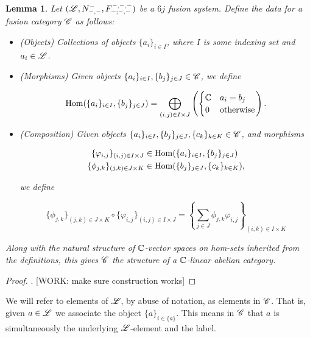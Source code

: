 \documentclass{article}
\newtheorem{lemma}{Lemma}[section]
\theoremstyle{definition}
\numberwithin{figure}{section}
\begin{document}
\begin{lemma} Let $(\mathscr{L},N_{\--,\--}^{\--},F^{\--,\--,\--}_{\--;\--,\--})$ be a $6j$ fusion system. Define the data for a fusion category $\mathscr{C}$ as follows:

\begin{itemize}
\item (Objects) Collections of objects $\{a_i\}_{i\in I}$, where $I$ is some indexing set and $a_i\in \mathscr{L}$.
\item (Morphisms) Given objects $\{a_{i}\}_{i\in I},\{b_j\}_{j\in J}\in \mathscr{C}$, we define

$$\mathrm{Hom}(\{a_{i}\}_{i\in I},\{b_j\}_{j\in J})=\bigoplus_{(i,j)\in I\times J}\left(\begin{cases} \mathbb{C} & a_i=b_j \\ 0 & \text{otherwise}\end{cases}\right).$$

\item (Composition) Given objects $\{a_{i}\}_{i\in I},\{b_j\}_{j\in J},\{c_k\}_{k\in K}\in \mathscr{C}$, and morphisms 

\begin{align*}
\{\varphi_{i,j}\}_{(i,j)\in I\times J}&\in \mathrm{Hom}(\{a_{i}\}_{i\in I},\{b_j\}_{j\in J})\\
\{\phi_{j,k}\}_{(j,k)\in J\times K}&\in \mathrm{Hom}(\{b_{j}\}_{j\in J},\{c_k\}_{k\in K}),
\end{align*}

we define

$$\{\phi_{j,k}\}_{(j,k)\in J\times K}\circ \{\varphi_{i,j}\}_{(i,j)\in I\times J}=\left\{\sum_{j\in J}\phi_{j,k}\varphi_{i,j}\right\}_{(i,k)\in I\times K}$$

\end{itemize}

Along with the natural structure of $\mathbb{C}$-vector spaces on hom-sets inherited from the definitions, this gives $\mathscr{C}$ the structure of a $\mathbb{C}$-linear abelian category.
\end{lemma}
\begin{proof}. [WORK: make sure construction works]
\end{proof}

We will refer to elements of $\mathscr{L}$, by abuse of notation, as elements in $\mathscr{C}$. That is, given $a\in \mathscr{L}$ we associate the object $\{a\}_{i\in \{a\}}$. This means in $\mathscr{C}$ that $a$ is simultaneously the underlying $\mathscr{L}$-element and the label.
\end{document}
